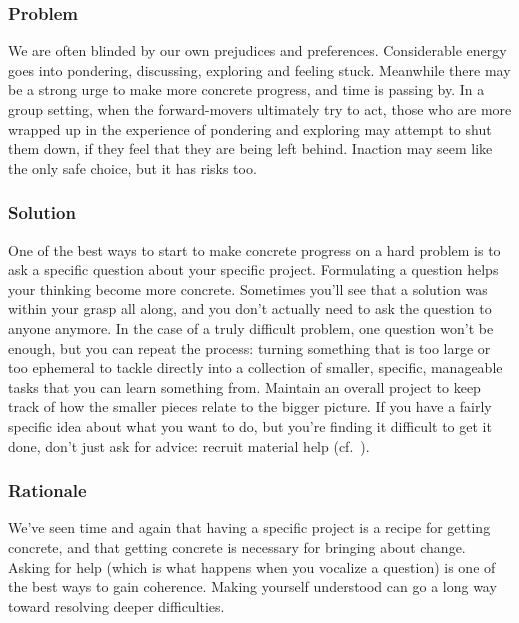 \subsubsection*{Problem}
We are often blinded by our own prejudices and preferences.  Considerable energy goes into pondering, discussing, exploring and feeling stuck.  Meanwhile there may be a strong urge to make more concrete progress, and time is passing by.  In a group setting, when the forward-movers ultimately try to act, those who are more wrapped up in the experience of pondering and exploring may attempt to shut them down, if they feel that they are being left behind.  Inaction may seem like the only safe choice, but it has risks too.

\subsubsection*{Solution} 
One of the best ways to start to make concrete progress on a hard problem is to ask a specific question about your specific project.   Formulating a question helps your thinking become more concrete.  Sometimes you'll see that a solution was within your grasp all along, and you don't actually need to ask the question to anyone anymore.  In the case of a truly difficult problem, one question won't be enough, but you can repeat the process: turning something that is too large or too ephemeral to tackle directly into a collection of smaller, specific, manageable tasks that you can learn something from. Maintain an overall project  to keep track of how the smaller pieces relate to the bigger picture.  If you have a fairly specific idea about what you want to do, but you're finding it difficult to get it done, don't just ask for advice: recruit material help (cf.~).
\subsubsection*{Rationale} 
We've seen time and again that having a specific project is a recipe
for getting concrete, and that getting concrete is necessary for
bringing about change.  Asking for help (which is what happens
when you vocalize a question) is one of the best ways to
gain coherence.  Making yourself understood can go a long way
toward resolving deeper difficulties.

